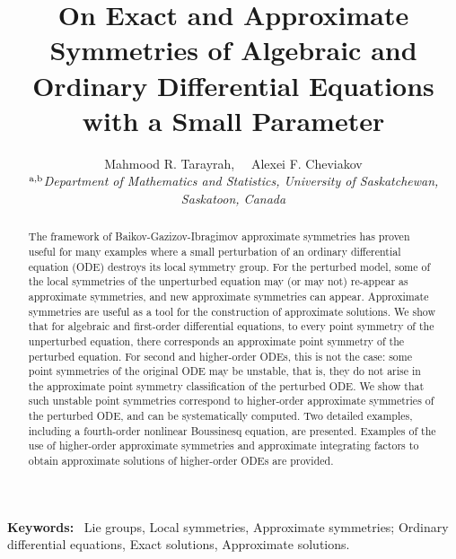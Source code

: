 \documentclass[11pt,letter,subeqn]{article}
\title{On Exact and Approximate Symmetries of Algebraic and Ordinary Differential Equations with a Small Parameter }
\author{ \renewcommand{\thefootnote}{\alph{footnote}}
Mahmood R. Tarayrah\footnotemark[1],~~ Alexei F. Cheviakov \footnotemark[2]\vspace{0.5cm}\\
\small $^{\rm a,b}$\emph{Department of Mathematics and Statistics, University of Saskatchewan, Saskatoon, Canada}\vspace{0.2cm}\\
}
\begin{document}


\maketitle {}
\maketitle {}

\begin{abstract}

The framework of Baikov-Gazizov-Ibragimov approximate symmetries has proven useful for many examples where a small perturbation of an ordinary differential equation (ODE) destroys its local symmetry group. For the perturbed model, some of the local symmetries of the unperturbed equation may (or may not) re-appear as approximate symmetries, and new approximate symmetries can appear. Approximate symmetries are useful as a tool for the construction of approximate solutions. We show that for algebraic and first-order differential equations, to every point symmetry of the unperturbed equation, there corresponds an approximate point symmetry of the perturbed equation. For second and higher-order ODEs, this is not the case: some point symmetries of the original ODE may be unstable, that is, they do not arise in the approximate point symmetry classification of the perturbed ODE. We show that such unstable point symmetries correspond to higher-order approximate symmetries of the perturbed ODE, and can be systematically computed. Two detailed examples, including a fourth-order nonlinear Boussinesq equation, are presented. Examples of the use of higher-order approximate symmetries and approximate integrating factors to obtain approximate solutions of higher-order ODEs are provided.



\end{abstract}

{\bf Keywords:}~ Lie groups, Local symmetries, Approximate symmetries; Ordinary differential equations, Exact solutions, Approximate solutions.
\end{document}
